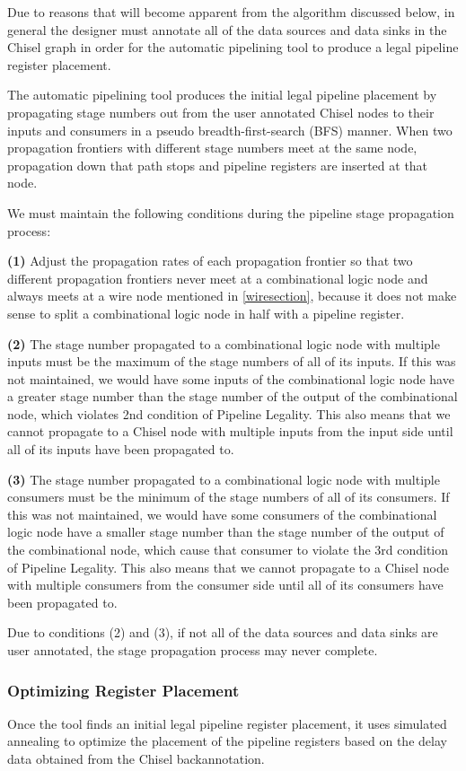 Due to reasons that will become apparent from the algorithm discussed below, in general the designer must annotate all of the data sources and data sinks in the Chisel graph in order for the automatic pipelining tool to produce a legal pipeline register placement.

The automatic pipelining tool produces the initial legal pipeline placement by propagating stage numbers out from the user annotated Chisel nodes to their inputs and consumers in a pseudo breadth-first-search (BFS) manner. When two propagation frontiers with different stage numbers meet at the same node, propagation down that path stops and pipeline registers are inserted at that node.

We must maintain the following conditions during the pipeline stage propagation process:

{\bf (1)} Adjust the propagation rates of each propagation frontier so that two different propagation frontiers never meet at a combinational logic node and always meets at a wire node mentioned in \ref{wiresection}, because it does not make sense to split a combinational logic node in half with a pipeline register.

{\bf (2)}  The stage number propagated to a combinational logic node with multiple inputs must be the maximum of the stage numbers of all of its inputs. If this was not maintained, we would have some inputs of the combinational logic node have a greater stage number than the stage number of the output of the combinational node, which violates 2nd condition of Pipeline Legality. This also means that we cannot propagate to a Chisel node with multiple inputs from the input side until all of its inputs have been propagated to.

{\bf (3)} The stage number propagated to a combinational logic node with multiple consumers must be the minimum of the stage numbers of all of its consumers. If this was not maintained, we would have some consumers of the combinational logic node have a smaller stage number than the stage number of the output of the combinational node, which cause that consumer to violate the 3rd condition of Pipeline Legality. This also means that we cannot propagate to a Chisel node with multiple consumers from the consumer side until all of its consumers have been propagated to.

Due to conditions (2) and (3), if not all of the data sources and data sinks are user annotated, the stage propagation process may never complete.
\subsubsection{Optimizing Register Placement}
Once the tool finds an initial legal pipeline register placement, it uses simulated annealing to optimize the placement of the pipeline registers based on the delay data obtained from the Chisel backannotation.

